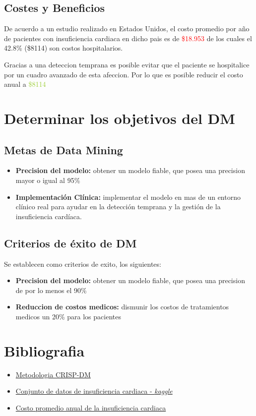 \documentclass[12pt, letterpaper, spanish]{article}
\begin{document}
\subsection{Costes y Beneficios}
De acuerdo a un estudio realizado en Estados Unidos, el costo promedio por año de pacientes
con insuficiencia cardiaca en dicho pais es de \textcolor{red}{\$18.953} de los cuales el 
42.8\% (\$8114) son costos hospitalarios.

Gracias a una deteccion temprana es posible evitar que el paciente se hospitalice por 
un cuadro avanzado de esta afeccion. Por lo que es posible reducir el costo anual a 
\textcolor{YellowGreen}{\$8114}
\section{Determinar los objetivos del DM}
\subsection{Metas de Data Mining}
\begin{itemize}
  \item{\textbf{Precision del modelo: }obtener un modelo fiable, que posea una precision 
  mayor o igual al 95\% }
  \item{\textbf{Implementación Clínica: }implementar el modelo en mas de un entorno clínico real 
  para ayudar en la detección temprana y la gestión de la insuficiencia cardíaca.}
\end{itemize}
\subsection{Criterios de éxito de DM}
Se establecen como criterios de exito, los siguientes:
\begin{itemize}
  \item{\textbf{Precision del modelo: }obtener un modelo fiable, que posea una precision de
  por lo menos el 90\% }
  \item{\textbf{Reduccion de costos medicos: }dismunir los costos de tratamientos medicos 
  un 20\% para los pacientes}
\end{itemize}

\section{Bibliografia}
\begin{itemize}
    \item \href{https://www.sngular.com/es/crisp-dm-fase-i-comprension-del-negocio/?authuser=0}
    {Metodologia CRISP-DM}
    \item \href{https://www.kaggle.com/datasets/fedesoriano/heart-failure-prediction}
    {Conjunto de datos de insuficiencia cardiaca - \emph{kaggle}}
    \item \href{URL}{Costo promedio anual de la insuficiencia cardiaca}
\end{itemize}
\end{document}
